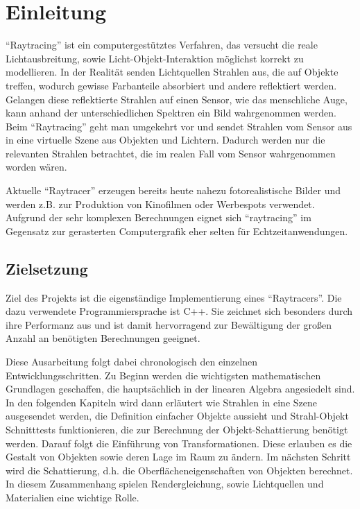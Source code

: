 
\chapter{Einleitung}

"`Raytracing"' ist ein computergestütztes Verfahren, das versucht die reale Lichtausbreitung, sowie Licht-Objekt-Interaktion möglichst korrekt zu modellieren. In der Realität senden Lichtquellen Strahlen aus, die auf Objekte
treffen, wodurch gewisse Farbanteile absorbiert und andere reflektiert werden.
Gelangen diese reflektierte Strahlen auf einen Sensor, wie das menschliche Auge, kann anhand der unterschiedlichen Spektren ein Bild wahrgenommen werden. 
Beim "`Raytracing"' geht man umgekehrt vor und sendet Strahlen vom Sensor aus in eine virtuelle Szene aus Objekten und Lichtern. Dadurch werden nur die relevanten Strahlen betrachtet, die im realen Fall vom Sensor wahrgenommen worden wären.

 Aktuelle "`Raytracer"' erzeugen bereits heute nahezu fotorealistische Bilder und werden z.B. zur Produktion von Kinofilmen oder Werbespots verwendet. Aufgrund der sehr komplexen Berechnungen eignet sich "`raytracing"' im Gegensatz zur gerasterten Computergrafik eher selten für Echtzeitanwendungen.




\section{Zielsetzung}


Ziel des Projekts ist die eigenständige Implementierung eines
"`Raytracers"'. Die dazu verwendete Programmiersprache ist C++. Sie zeichnet sich besonders durch ihre Performanz aus und ist damit hervorragend zur Bewältigung der großen Anzahl an benötigten Berechnungen geeignet.

 Diese Ausarbeitung folgt dabei chronologisch den einzelnen Entwicklungsschritten. Zu Beginn werden die wichtigsten mathematischen Grundlagen geschaffen, die hauptsächlich in  der linearen Algebra angesiedelt sind. In den folgenden Kapiteln wird dann erläutert wie Strahlen in eine Szene ausgesendet werden, die Definition einfacher Objekte aussieht und Strahl-Objekt Schnitttests funktionieren, die zur Berechnung der  Objekt-Schattierung benötigt werden. Darauf folgt die Einführung von Transformationen. Diese erlauben es die Gestalt von Objekten sowie deren Lage im Raum zu ändern. Im nächsten Schritt wird die Schattierung, d.h. die Oberflächeneigenschaften von Objekten berechnet. In diesem Zusammenhang spielen Rendergleichung, sowie Lichtquellen und Materialien eine wichtige Rolle.
 
